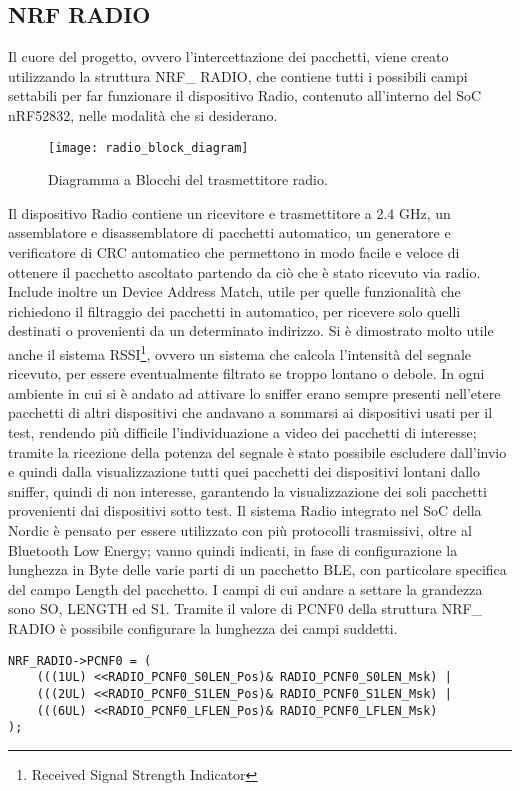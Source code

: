 \subsection{NRF RADIO}
Il cuore del progetto, ovvero l'intercettazione dei pacchetti, viene creato utilizzando la struttura NRF\_ RADIO, che contiene tutti i possibili campi settabili per far funzionare il dispositivo Radio, contenuto all'interno del SoC nRF52832, nelle modalità che si desiderano.
\begin{figure}[H]
\texttt{[image: radio\_block\_diagram]}
\centering
\caption{Diagramma a Blocchi del trasmettitore radio.}
\end{figure}
Il dispositivo Radio contiene un ricevitore e trasmettitore a 2.4 GHz, un assemblatore e disassemblatore di pacchetti automatico, un generatore e verificatore di CRC automatico che permettono in modo facile e veloce di ottenere il pacchetto ascoltato partendo da ciò che è stato ricevuto via radio. Include inoltre un Device Address Match, utile per quelle funzionalità che richiedono il filtraggio dei pacchetti in automatico, per ricevere solo quelli destinati o provenienti da un determinato indirizzo. Si è dimostrato molto utile anche il sistema RSSI\footnote{Received Signal Strength Indicator}, ovvero un sistema che calcola l'intensità del segnale ricevuto, per essere eventualmente filtrato se troppo lontano o debole.
In ogni ambiente in cui si è andato ad attivare lo sniffer erano sempre presenti nell'etere pacchetti di altri dispositivi che andavano a sommarsi ai dispositivi usati per il test, rendendo più difficile l'individuazione a video dei pacchetti di interesse; tramite la ricezione della potenza del segnale è stato possibile escludere dall'invio e quindi dalla visualizzazione tutti quei pacchetti dei dispositivi lontani dallo sniffer, quindi di non interesse, garantendo la visualizzazione dei soli pacchetti provenienti dai dispositivi sotto test.
Il sistema Radio integrato nel SoC della Nordic è pensato per essere utilizzato con più protocolli trasmissivi, oltre al Bluetooth Low Energy; vanno quindi indicati, in fase di configurazione la lunghezza in Byte delle varie parti di un pacchetto BLE, con particolare specifica del campo Length del pacchetto. I campi di cui andare a settare la grandezza sono SO, LENGTH ed S1.
Tramite il valore di PCNF0 della struttura NRF\_ RADIO è possibile configurare la lunghezza dei campi suddetti.



\begin{verbatim}
NRF_RADIO->PCNF0 = (
	(((1UL) <<RADIO_PCNF0_S0LEN_Pos)& RADIO_PCNF0_S0LEN_Msk) |  
	(((2UL) <<RADIO_PCNF0_S1LEN_Pos)& RADIO_PCNF0_S1LEN_Msk) |  
	(((6UL) <<RADIO_PCNF0_LFLEN_Pos)& RADIO_PCNF0_LFLEN_Msk)   
);
\end{verbatim}

